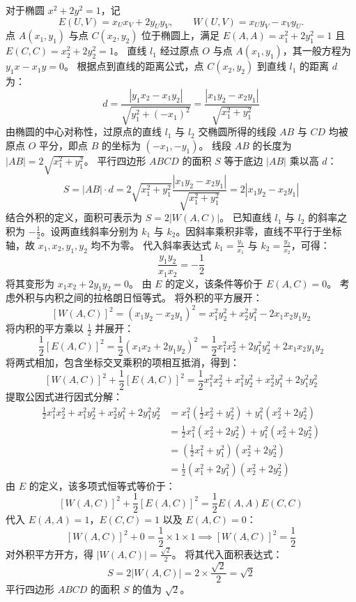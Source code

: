 \begin{solution}
对于椭圆 $x^2 + 2y^2 = 1$，记
\[
E(U, V) = x_U x_V + 2y_U y_V,\qquad W(U, V) = x_U y_V - x_V y_U.
\]
点 $A(x_1, y_1)$ 与点 $C(x_2, y_2)$ 位于椭圆上，满足 $E(A, A) = x_1^2 + 2y_1^2 = 1$ 且 $E(C, C) = x_2^2 + 2y_2^2 = 1$。
直线 $l_1$ 经过原点 $O$ 与点 $A(x_1, y_1)$，其一般方程为 $y_1 x - x_1 y = 0$。
根据点到直线的距离公式，点 $C(x_2, y_2)$ 到直线 $l_1$ 的距离 $d$ 为：
$$ d = \frac{|y_1 x_2 - x_1 y_2|}{\sqrt{y_1^2 + (-x_1)^2}} = \frac{|x_1 y_2 - x_2 y_1|}{\sqrt{x_1^2 + y_1^2}} $$
由椭圆的中心对称性，过原点的直线 $l_1$ 与 $l_2$ 交椭圆所得的线段 $AB$ 与 $CD$ 均被原点 $O$ 平分，即点 $B$ 的坐标为 $(-x_1, -y_1)$。
线段 $AB$ 的长度为 $|AB| = 2\sqrt{x_1^2 + y_1^2}$。
平行四边形 $ABCD$ 的面积 $S$ 等于底边 $|AB|$ 乘以高 $d$：
$$ S = |AB| \cdot d = 2\sqrt{x_1^2 + y_1^2} \frac{|x_1 y_2 - x_2 y_1|}{\sqrt{x_1^2 + y_1^2}} = 2|x_1 y_2 - x_2 y_1| $$
结合外积的定义，面积可表示为 $S = 2|W(A, C)|$。
已知直线 $l_1$ 与 $l_2$ 的斜率之积为 $-\frac{1}{2}$。设两直线斜率分别为 $k_1$ 与 $k_2$。因斜率乘积非零，直线不平行于坐标轴，故 $x_1, x_2, y_1, y_2$ 均不为零。
代入斜率表达式 $k_1 = \frac{y_1}{x_1}$ 与 $k_2 = \frac{y_2}{x_2}$，可得：
$$ \frac{y_1 y_2}{x_1 x_2} = -\frac{1}{2} $$
将其变形为 $x_1 x_2 + 2y_1 y_2 = 0$。
由 $E$ 的定义，该条件等价于 $E(A, C) = 0$。
考虑外积与内积之间的拉格朗日恒等式。
将外积的平方展开：
$$ [W(A, C)]^2 = (x_1 y_2 - x_2 y_1)^2 = x_1^2 y_2^2 + x_2^2 y_1^2 - 2x_1 x_2 y_1 y_2 $$
将内积的平方乘以 $\frac{1}{2}$ 并展开：
$$ \frac{1}{2} [E(A, C)]^2 = \frac{1}{2} (x_1 x_2 + 2y_1 y_2)^2 = \frac{1}{2} x_1^2 x_2^2 + 2y_1^2 y_2^2 + 2x_1 x_2 y_1 y_2 $$
将两式相加，包含坐标交叉乘积的项相互抵消，得到：
$$ [W(A, C)]^2 + \frac{1}{2} [E(A, C)]^2 = \frac{1}{2} x_1^2 x_2^2 + x_1^2 y_2^2 + x_2^2 y_1^2 + 2y_1^2 y_2^2 $$
提取公因式进行因式分解：
\begin{align*}
\frac{1}{2} x_1^2 x_2^2 + x_1^2 y_2^2 + x_2^2 y_1^2 + 2y_1^2 y_2^2 &= x_1^2 \left(\frac{1}{2} x_2^2 + y_2^2\right) + y_1^2 (x_2^2 + 2y_2^2) \\
&= \frac{1}{2} x_1^2 (x_2^2 + 2y_2^2) + y_1^2 (x_2^2 + 2y_2^2) \\
&= \left(\frac{1}{2} x_1^2 + y_1^2\right) (x_2^2 + 2y_2^2) \\
&= \frac{1}{2} (x_1^2 + 2y_1^2) (x_2^2 + 2y_2^2)
\end{align*}
由 $E$ 的定义，该多项式恒等式等价于：
$$ [W(A, C)]^2 + \frac{1}{2} [E(A, C)]^2 = \frac{1}{2} E(A, A) E(C, C) $$
代入 $E(A, A) = 1$，$E(C, C) = 1$ 以及 $E(A, C) = 0$：
$$ [W(A, C)]^2 + 0 = \frac{1}{2} \times 1 \times 1 \implies [W(A, C)]^2 = \frac{1}{2} $$
对外积平方开方，得 $|W(A, C)| = \frac{\sqrt{2}}{2}$。
将其代入面积表达式：
$$ S = 2|W(A, C)| = 2 \times \frac{\sqrt{2}}{2} = \sqrt{2} $$
平行四边形 $ABCD$ 的面积 $S$ 的值为 $\sqrt{2}$。
\end{solution}


